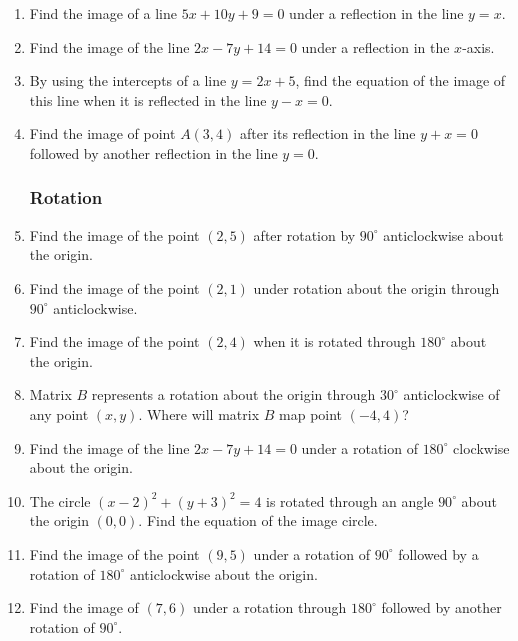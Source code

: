\begin{enumerate}
	\item Find the image of a line $5x + 10y + 9 = 0$ under a reflection in the line $y = x$.
	
	\item Find the image of the line $2x - 7y + 14 = 0$ under a reflection in the $x$-axis.
	
	\item By using the intercepts of a line $y = 2x + 5$, find the equation of the image of this line when it is reflected in the line $y - x = 0$.
			
	\item Find the image of point $A(3,4)$ after its reflection in the line $y + x = 0$ followed by another reflection in the line $y = 0$.
	
	
	
	
	
	
			\subsubsection{Rotation}
		
	\item Find the image of the point $(2,5)$ after rotation by $90^\circ$ anticlockwise about the origin.
	
	\item Find the image of the point $(2,1)$ under rotation about the origin through $90^\circ$ anticlockwise.
	
	\item Find the image of the point $(2,4)$ when it is rotated through $180^\circ$ about the origin.
		
	\item Matrix $B$ represents a rotation about the origin through $30^\circ$ anticlockwise of any point $(x,y)$. Where will matrix $B$ map point $(-4,4)$?
			
	\item Find the image of the line $2x - 7y + 14 = 0$ under a rotation of $180^\circ$ clockwise about the origin.
		
	\item The circle $(x - 2)^2 + (y + 3)^2 = 4$ is rotated through an angle $90^\circ$ about the origin $(0,0)$. Find the equation of the image circle.
	
	\item Find the image of the point $(9,5)$ under a rotation of $90^\circ$ followed by a rotation of $180^\circ$ anticlockwise about the origin.
	
	\item Find the image of $(7,6)$ under a rotation through $180^\circ$ followed by another rotation of $90^\circ$.
	

\end{enumerate}
